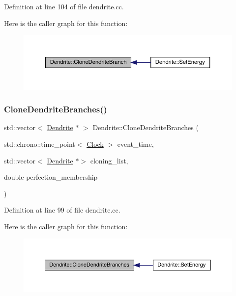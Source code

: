 Definition at line 104 of file dendrite.\+cc.

Here is the caller graph for this function\+:\nopagebreak
\begin{figure}[H]
\begin{center}
\leavevmode
\includegraphics[width=350pt]{class_dendrite_ab682ffb9bfd1a1da1623e6b641471068_icgraph}
\end{center}
\end{figure}
\mbox{\label{class_dendrite_abd67c09df69c520e6720bca2592bcc99}} 
\subsubsection{\texorpdfstring{Clone\+Dendrite\+Branches()}{CloneDendriteBranches()}}
{\footnotesize\ttfamily std\+::vector$<$ \hyperlink{class_dendrite}{Dendrite} $\ast$ $>$ Dendrite\+::\+Clone\+Dendrite\+Branches (\begin{DoxyParamCaption}\item[{std\+::chrono\+::time\+\_\+point$<$ \hyperlink{universe_8h_a0ef8d951d1ca5ab3cfaf7ab4c7a6fd80}{Clock} $>$}]{event\+\_\+time,  }\item[{std\+::vector$<$ \hyperlink{class_dendrite}{Dendrite} $\ast$$>$}]{cloning\+\_\+list,  }\item[{double}]{perfection\+\_\+membership }\end{DoxyParamCaption})}



Definition at line 99 of file dendrite.\+cc.

Here is the caller graph for this function\+:\nopagebreak
\begin{figure}[H]
\begin{center}
\leavevmode
\includegraphics[width=350pt]{class_dendrite_abd67c09df69c520e6720bca2592bcc99_icgraph}
\end{center}
\end{figure}
\mbox{\label{class_dendrite_ac7b30397a4753f9c37e96ed716e275eb}} 
